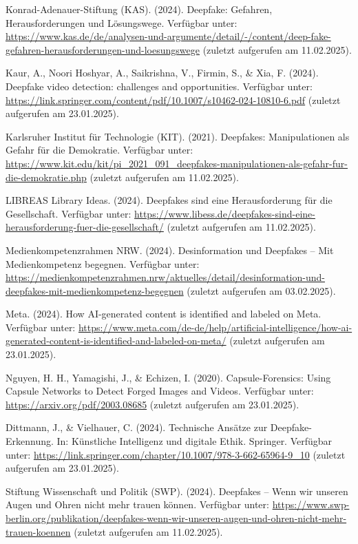 \documentclass[a4paper,12pt]{article}
\begin{document}
\begin{thebibliography}{99}
 Konrad-Adenauer-Stiftung (KAS). (2024). Deepfake: Gefahren, Herausforderungen und Lösungswege.
Verfügbar unter: \url{https://www.kas.de/de/analysen-und-argumente/detail/-/content/deep-fake-gefahren-herausforderungen-und-loesungswege} (zuletzt aufgerufen am 11.02.2025).

 Kaur, A., Noori Hoshyar, A., Saikrishna, V., Firmin, S., \& Xia, F. (2024). Deepfake video detection: challenges and opportunities. 
Verfügbar unter: \url{https://link.springer.com/content/pdf/10.1007/s10462-024-10810-6.pdf} (zuletzt aufgerufen am 23.01.2025).

 Karlsruher Institut für Technologie (KIT). (2021). Deepfakes: Manipulationen als Gefahr für die Demokratie.
Verfügbar unter: \url{https://www.kit.edu/kit/pi_2021_091_deepfakes-manipulationen-als-gefahr-fur-die-demokratie.php} (zuletzt aufgerufen am 11.02.2025).

 LIBREAS Library Ideas. (2024). Deepfakes sind eine Herausforderung für die Gesellschaft.
Verfügbar unter: \url{https://www.libess.de/deepfakes-sind-eine-herausforderung-fuer-die-gesellschaft/} (zuletzt aufgerufen am 11.02.2025).

 Medienkompetenzrahmen NRW. (2024). Desinformation und Deepfakes – Mit Medienkompetenz begegnen. 
Verfügbar unter: \url{https://medienkompetenzrahmen.nrw/aktuelles/detail/desinformation-und-deepfakes-mit-medienkompetenz-begegnen} (zuletzt aufgerufen am 03.02.2025).

 Meta. (2024). How AI-generated content is identified and labeled on Meta. 
Verfügbar unter: \url{https://www.meta.com/de-de/help/artificial-intelligence/how-ai-generated-content-is-identified-and-labeled-on-meta/} (zuletzt aufgerufen am 23.01.2025).

 Nguyen, H. H., Yamagishi, J., \& Echizen, I. (2020). Capsule-Forensics: Using Capsule Networks to Detect Forged Images and Videos.
Verfügbar unter: \url{https://arxiv.org/pdf/2003.08685} (zuletzt aufgerufen am 23.01.2025).

 Dittmann, J., \& Vielhauer, C. (2024). Technische Ansätze zur Deepfake-Erkennung. In: Künstliche Intelligenz und digitale Ethik. Springer. 
Verfügbar unter: \url{https://link.springer.com/chapter/10.1007/978-3-662-65964-9_10} (zuletzt aufgerufen am 23.01.2025).

 Stiftung Wissenschaft und Politik (SWP). (2024). Deepfakes – Wenn wir unseren Augen und Ohren nicht mehr trauen können.  
Verfügbar unter: \url{https://www.swp-berlin.org/publikation/deepfakes-wenn-wir-unseren-augen-und-ohren-nicht-mehr-trauen-koennen} (zuletzt aufgerufen am 11.02.2025).


\end{thebibliography}
\end{document}

